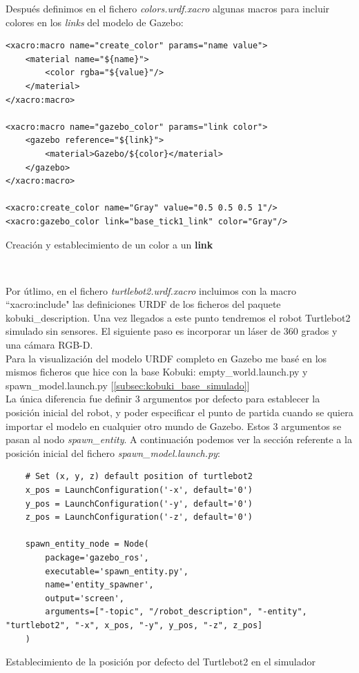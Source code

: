 Después definimos en el fichero \textit{colors.urdf.xacro} algunas macros para incluir colores en los \textit{links} del modelo de Gazebo:\\
\begin{code}[H]
\begin{lstlisting}
<xacro:macro name="create_color" params="name value">
	<material name="${name}">
		<color rgba="${value}"/>
	</material>
</xacro:macro>

<xacro:macro name="gazebo_color" params="link color">
	<gazebo reference="${link}">
		<material>Gazebo/${color}</material>
	</gazebo>
</xacro:macro>

<xacro:create_color name="Gray" value="0.5 0.5 0.5 1"/>
<xacro:gazebo_color link="base_tick1_link" color="Gray"/>
\end{lstlisting}
\caption{Creación y establecimiento de un color a un \textbf{link}}
\label{fig:creacion_color_link}
\end{code}\

Por útlimo, en el fichero \textit{turtlebot2.urdf.xacro} incluimos con la macro ``xacro:include" las definiciones URDF de los ficheros del paquete kobuki\_description. Una vez llegados a este punto tendremos el robot Turtlebot2 simulado sin sensores. El siguiente paso es incorporar un láser de 360 grados y una cámara RGB-D.\\

Para la visualización del modelo URDF completo en Gazebo me basé en los mismos ficheros que hice con la base Kobuki: empty\_world.launch.py y spawn\_model.launch.py [\ref{subsec:kobuki_base_simulado}]\\

La única diferencia fue definir 3 argumentos por defecto para establecer la posición inicial del robot, y poder especificar el punto de partida cuando se quiera importar el modelo en cualquier otro mundo de Gazebo. Estos 3 argumentos se pasan al nodo \textit{spawn\_entity}. A continuación podemos ver la sección referente a la posición inicial del fichero \textit{spawn\_model.launch.py}:\\

\begin{code}[H]
\begin{lstlisting}
	# Set (x, y, z) default position of turtlebot2
	x_pos = LaunchConfiguration('-x', default='0')
	y_pos = LaunchConfiguration('-y', default='0')
	z_pos = LaunchConfiguration('-z', default='0')
	
	spawn_entity_node = Node(
		package='gazebo_ros',
		executable='spawn_entity.py',
		name='entity_spawner',
		output='screen',
		arguments=["-topic", "/robot_description", "-entity", "turtlebot2", "-x", x_pos, "-y", y_pos, "-z", z_pos]
	)
\end{lstlisting}
\caption{Establecimiento de la posición por defecto del Turtlebot2 en el simulador}
\label{cod:posicion_defecto_turtlebot2_simulador}
\end{code}\

